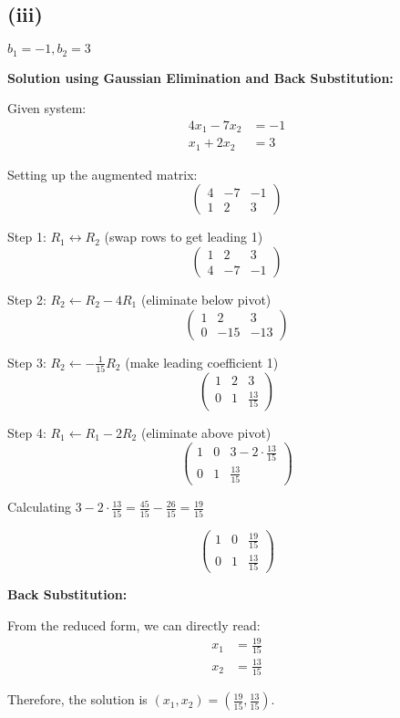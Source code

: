 \subsection*{(iii)} $b_1 = -1, b_2 = 3$

\textbf{Solution using Gaussian Elimination and Back Substitution:}

Given system:
\begin{align}
4x_1 - 7x_2 &= -1\\
x_1 + 2x_2 &= 3
\end{align}

Setting up the augmented matrix:
\[
\left(\begin{array}{cc|c}
4 & -7 & -1\\
1 & 2 & 3
\end{array}\right)
\]

Step 1: $R_1 \leftrightarrow R_2$ (swap rows to get leading 1)
\[
\left(\begin{array}{cc|c}
1 & 2 & 3\\
4 & -7 & -1
\end{array}\right)
\]

Step 2: $R_2 \leftarrow R_2 - 4R_1$ (eliminate below pivot)
\[
\left(\begin{array}{cc|c}
1 & 2 & 3\\
0 & -15 & -13
\end{array}\right)
\]

Step 3: $R_2 \leftarrow -\frac{1}{15}R_2$ (make leading coefficient 1)
\[
\left(\begin{array}{cc|c}
1 & 2 & 3\\
0 & 1 & \frac{13}{15}
\end{array}\right)
\]

Step 4: $R_1 \leftarrow R_1 - 2R_2$ (eliminate above pivot)
\[
\left(\begin{array}{cc|c}
1 & 0 & 3 - 2 \cdot \frac{13}{15}\\
0 & 1 & \frac{13}{15}
\end{array}\right)
\]

Calculating $3 - 2 \cdot \frac{13}{15} = \frac{45}{15} - \frac{26}{15} = \frac{19}{15}$

\[
\left(\begin{array}{cc|c}
1 & 0 & \frac{19}{15}\\
0 & 1 & \frac{13}{15}
\end{array}\right)
\]

\textbf{Back Substitution:}

From the reduced form, we can directly read:
\begin{align*}
x_1 &= \frac{19}{15}\\
x_2 &= \frac{13}{15}
\end{align*}

Therefore, the solution is $\boxed{\left(x_1, x_2\right) = \left(\frac{19}{15}, \frac{13}{15}\right)}$.